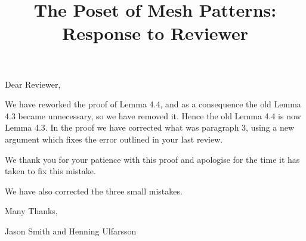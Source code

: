 \documentclass{article}
\title{The Poset of Mesh Patterns:\\ Response to Reviewer}
\author{}
\date{}
\begin{document}
	\maketitle
	
	Dear Reviewer,

\vskip 20pt

We have reworked the proof of Lemma 4.4, and as a consequence the old Lemma 4.3 became unnecessary, so we have removed it. Hence the old Lemma 4.4 is now Lemma 4.3. In the proof we have corrected what was paragraph 3, using a new argument which fixes the error outlined in your last review.

We thank you for your patience with this proof and apologise for the time it has taken to fix this mistake. 

We have also corrected the three small mistakes.

\vskip 20pt

Many Thanks,

Jason Smith and Henning Ulfarsson
\end{document}
